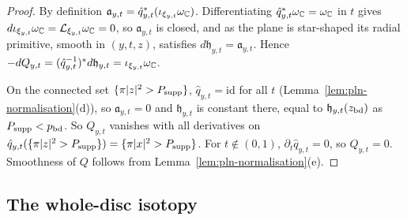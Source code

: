 \begin{proof}
By definition $\mathfrak a_{y,t}=\hat q_{y,t}^*(\iota_{\xi_{y,t}}\omega_{\mathbb{C}})$. Differentiating $\hat q_{y,t}^*\omega_{\mathbb{C}}=\omega_{\mathbb{C}}$ in $t$ gives $d\iota_{\xi_{y,t}}\omega_{\mathbb{C}}=\mathcal L_{\xi_{y,t}}\omega_{\mathbb{C}}=0$, so $\mathfrak a_{y,t}$ is closed, and as the plane is star-shaped its radial primitive, smooth in $(y,t,z)$, satisfies $d\mathfrak h_{y,t}=\mathfrak a_{y,t}$. Hence $-dQ_{y,t}=(\hat q_{y,t}^{-1})^*d\mathfrak h_{y,t}=\iota_{\xi_{y,t}}\omega_{\mathbb{C}}$.

On the connected set $\{\pi|z|^2>P_{\rm supp}\}$, $\hat q_{y,t}=\mathrm{id}$ for all $t$ (Lemma~\ref{lem:pln-normalisation}(d)), so $\mathfrak a_{y,t}=0$ and $\mathfrak h_{y,t}$ is constant there, equal to $\mathfrak h_{y,t}(z_{\rm bd})$ as $P_{\rm supp}<p_{\rm bd}$. So $Q_{y,t}$ vanishes with all derivatives on $\hat q_{y,t}(\{\pi|z|^2>P_{\rm supp}\})=\{\pi|x|^2>P_{\rm supp}\}$. For $t\notin(0,1)$, $\partial_t\hat q_{y,t}=0$, so $Q_{y,t}=0$. Smoothness of $Q$ follows from Lemma~\ref{lem:pln-normalisation}(e).
\end{proof}

\subsection{The whole-disc isotopy}\label{sec:pln-isotopy}

